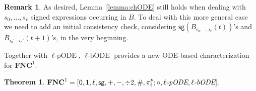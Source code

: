 \documentclass[11pt, oneside]{article}
\newcommand{\fun}[1]{\mathsf{#1}}
\newcommand{\NC}{\mathbf{FNC}}
\newtheorem{theorem}{Theorem}
\theoremstyle{definition}
\newtheorem{remark}{Remark}
\newcommand{\chODE}{\ell\text{-bODE}}
\newcommand{\pODE}{\ell\text{-pODE}}
\begin{document}

\begin{remark}
    As desired, Lemma~\ref{lemma:chODE} still holds when dealing with $s_0, \dots, s_r$ signed expressions occurring in $B$.
    To deal with this more general case we need to add an initial consistency check, considering $\fun{sg}(B_{i_0,\dots, i_r}(t))$'s and $B_{i_0'\dots i_r'}(t+1)$'s, in the very beginning.
\end{remark}




Together with $\pODE$, $\chODE$ provides a new ODE-based characterization for $\NC^1$.

\begin{theorem}
    $\NC^1 = [\fun{0}, \fun{1}, \ell, \fun{sg}, +, -, \div 2, \#, \pi^p_i; \circ, \ell\emph{-pODE}, \ell\emph{-bODE}].$
\end{theorem}
\end{document}
